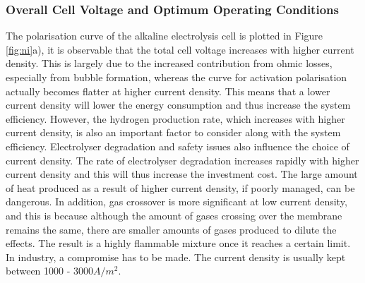 \subsubsection{Overall Cell Voltage and Optimum Operating Conditions}
The polarisation curve of the alkaline electrolysis cell is plotted in Figure \ref{fig:ni}a), it is observable that the total cell voltage increases with higher current density. This is largely due to the increased contribution from ohmic losses, especially from bubble formation, whereas the curve for activation polarisation actually becomes flatter at higher current density. This means that a lower current density will lower the energy consumption and thus increase the system efficiency. However, the hydrogen production rate, which increases with higher current density,  is also an important factor to consider along with the system efficiency.  Electrolyser degradation and safety issues also influence the choice of current density. The rate of electrolyser degradation increases rapidly with higher current density and this will thus increase the investment cost. The large amount of heat produced as a result of higher current density, if poorly managed, can be dangerous. In addition, gas crossover is more significant at low current density, and this is because although the amount of gases crossing over the membrane remains the same, there are smaller amounts of gases produced to dilute the effects. The result is a highly flammable mixture once it reaches a certain limit. In industry, a compromise has to be made. The current density is usually kept between 1000 - 3000$A/m^2$. \cite{currentdensity}

